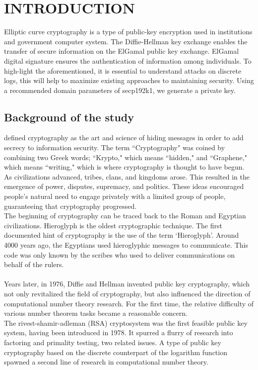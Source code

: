 
\chapter{INTRODUCTION}
Elliptic curve cryptography is a type of public-key encryption used in institutions and government computer system. The Diffie-Hellman key exchange enables the transfer of secure information on the ElGamal public key exchange. ElGamal digital signature ensures the authentication of information among individuals. To high-light the aforementioned, it is essential to understand attacks on discrete logs, this will help to maximize existing approaches to maintaining security. Using a recommended domain parameters of secp192k1, we generate a private key.
\section{Background of the study}
\cite{manoj2010cryptography} defined cryptography as the art and science of hiding messages in order to add secrecy to information security. The term ``Cryptography" was coined by combining two Greek words; ``Krypto," which means ``hidden," and ``Graphene," which means ``writing," which is where cryptography is thought to have begun. As civilizations advanced, tribes, clans, and kingdoms arose. This resulted in the emergence of power, disputes, supremacy, and politics. These ideas encouraged people's natural need to engage privately with a limited group of people, guaranteeing that cryptography progressed.\\
The beginning of cryptography can be traced back to the  Roman and Egyptian civilizations. Hieroglyph is the oldest cryptographic technique. The first documented hint of cryptography is the use of the term `Hieroglyph'. Around 4000 years ago, the Egyptians used hieroglyphic messages to communicate. This code was only known by the scribes who used to deliver communications on behalf of the rulers.\\\\
Years later, in 1976, Diffie and Hellman invented public key cryptography, which not only revitalized the field of cryptography, but also influenced the direction of computational number theory research. For the first time, the relative difficulty of various number theorem tasks became a reasonable concern.\\
The rivest-shamir-adleman (RSA) cryptosystem was the first feasible public key system, having been introduced in 1978. It spurred a flurry of research into factoring and primality testing, two related issues. A type of public key cryptography based on the discrete counterpart of the logarithm function spawned a second line of research in computational number theory.\\
